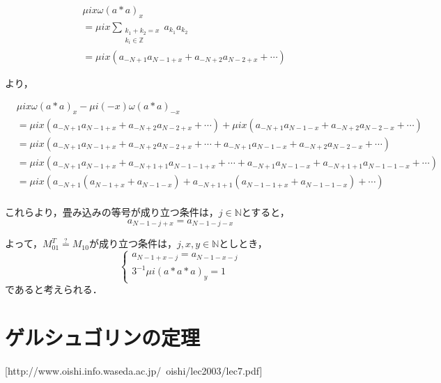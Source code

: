 \documentclass[11pt,a4paper,titlepage]{jsreport}
\theoremstyle{definition}
\begin{document}
\begin{equation}
  \begin{split}
    &\mu i x \omega (a*a)_{x}\\
    &= \mu ix \sum_{\substack{k_1+k_2=x \\ k_i\in\mathbb{Z}}} a_{k_1}a_{k_2}\\
    &= \mu ix (a_{-N+1}a_{N-1+x}+a_{-N+2}a_{N-2+x}+\cdots)
  \end{split}
\end{equation}

より，

\begin{equation}
  \begin{split}
    &\mu i x \omega (a*a)_{x} - \mu i (-x) \omega (a*a)_{-x} \\
    &= \mu ix (a_{-N+1}a_{N-1+x}+a_{-N+2}a_{N-2+x}+\cdots) + \mu ix (a_{-N+1}a_{N-1-x}+a_{-N+2}a_{N-2-x}+\cdots)\\
    &= \mu ix (a_{-N+1}a_{N-1+x}+a_{-N+2}a_{N-2+x}+\cdots + a_{-N+1}a_{N-1-x}+a_{-N+2}a_{N-2-x}+\cdots)\\
    &= \mu ix (a_{-N+1}a_{N-1+x}+a_{-N+1+1}a_{N-1-1+x}+\cdots + a_{-N+1}a_{N-1-x}+a_{-N+1+1}a_{N-1-1-x}+\cdots)\\
    &= \mu ix (a_{-N+1}(a_{N-1+x}+a_{N-1-x})+a_{-N+1+1}(a_{N-1-1+x}+a_{N-1-1-x})+\cdots )\\
  \end{split}
\end{equation}

これらより，畳み込みの等号が成り立つ条件は，$j\in \mathbb{N}$とすると，
\begin{equation}
  a_{N-1-j+x} = a_{N-1-j-x}
\end{equation}

よって，$M_{01}^T \stackrel{\mathrm{?}}{=} M_{10}$が成り立つ条件は，$j,x,y\in \mathbb{N}$としとき，
\begin{equation}
  \begin{cases}
    a_{N-1+x-j} = a_{N-1-x-j}\\
    3^{-1}\mu i (a*a*a)_y = 1
  \end{cases}
\end{equation}
であると考えられる．


\section*{ゲルシュゴリンの定理}
[http://www.oishi.info.waseda.ac.jp/~oishi/lec2003/lec7.pdf] \\
\end{document}
